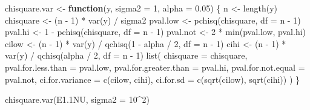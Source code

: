 \documentclass[
]{book}
\newenvironment{Shaded}{\begin{snugshade}}{\end{snugshade}}
\newcommand{\AttributeTok}[1]{\textcolor[rgb]{0.77,0.63,0.00}{#1}}
\newcommand{\ControlFlowTok}[1]{\textcolor[rgb]{0.13,0.29,0.53}{\textbf{#1}}}
\newcommand{\DecValTok}[1]{\textcolor[rgb]{0.00,0.00,0.81}{#1}}
\newcommand{\FloatTok}[1]{\textcolor[rgb]{0.00,0.00,0.81}{#1}}
\newcommand{\FunctionTok}[1]{\textcolor[rgb]{0.00,0.00,0.00}{#1}}
\newcommand{\NormalTok}[1]{#1}
\newcommand{\OtherTok}[1]{\textcolor[rgb]{0.56,0.35,0.01}{#1}}
\newcommand{\SpecialCharTok}[1]{\textcolor[rgb]{0.00,0.00,0.00}{#1}}
\begin{document}
\begin{Shaded}
\begin{Highlighting}[]
\NormalTok{chisquare.var }\OtherTok{\textless{}{-}} \ControlFlowTok{function}\NormalTok{(y, }\AttributeTok{sigma2 =} \DecValTok{1}\NormalTok{, }\AttributeTok{alpha =} \FloatTok{0.05}\NormalTok{) \{}
\NormalTok{  n }\OtherTok{\textless{}{-}} \FunctionTok{length}\NormalTok{(y)}
\NormalTok{  chisquare }\OtherTok{\textless{}{-}}\NormalTok{ (n }\SpecialCharTok{{-}} \DecValTok{1}\NormalTok{) }\SpecialCharTok{*} \FunctionTok{var}\NormalTok{(y) }\SpecialCharTok{/}\NormalTok{ sigma2}
\NormalTok{  pval.low }\OtherTok{\textless{}{-}} \FunctionTok{pchisq}\NormalTok{(chisquare, }\AttributeTok{df =}\NormalTok{ n }\SpecialCharTok{{-}} \DecValTok{1}\NormalTok{)}
\NormalTok{  pval.hi }\OtherTok{\textless{}{-}} \DecValTok{1} \SpecialCharTok{{-}} \FunctionTok{pchisq}\NormalTok{(chisquare, }\AttributeTok{df =}\NormalTok{ n }\SpecialCharTok{{-}} \DecValTok{1}\NormalTok{)}
\NormalTok{  pval.not }\OtherTok{\textless{}{-}} \DecValTok{2} \SpecialCharTok{*} \FunctionTok{min}\NormalTok{(pval.low, pval.hi)}
\NormalTok{  cilow }\OtherTok{\textless{}{-}}\NormalTok{ (n }\SpecialCharTok{{-}} \DecValTok{1}\NormalTok{) }\SpecialCharTok{*} \FunctionTok{var}\NormalTok{(y) }\SpecialCharTok{/} \FunctionTok{qchisq}\NormalTok{(}\DecValTok{1} \SpecialCharTok{{-}}\NormalTok{ alpha }\SpecialCharTok{/} \DecValTok{2}\NormalTok{, }\AttributeTok{df =}\NormalTok{ n }\SpecialCharTok{{-}} \DecValTok{1}\NormalTok{)}
\NormalTok{  cihi }\OtherTok{\textless{}{-}}\NormalTok{ (n }\SpecialCharTok{{-}} \DecValTok{1}\NormalTok{) }\SpecialCharTok{*} \FunctionTok{var}\NormalTok{(y) }\SpecialCharTok{/} \FunctionTok{qchisq}\NormalTok{(alpha }\SpecialCharTok{/} \DecValTok{2}\NormalTok{, }\AttributeTok{df =}\NormalTok{ n }\SpecialCharTok{{-}} \DecValTok{1}\NormalTok{)}
  \FunctionTok{list}\NormalTok{(}
    \AttributeTok{chisquare =}\NormalTok{ chisquare, }\AttributeTok{pval.for.less.than =}\NormalTok{ pval.low,}
    \AttributeTok{pval.for.greater.than =}\NormalTok{ pval.hi, }\AttributeTok{pval.for.not.equal =}\NormalTok{ pval.not,}
    \AttributeTok{ci.for.variance =} \FunctionTok{c}\NormalTok{(cilow, cihi), }\AttributeTok{ci.for.sd =} \FunctionTok{c}\NormalTok{(}\FunctionTok{sqrt}\NormalTok{(cilow), }\FunctionTok{sqrt}\NormalTok{(cihi))}
\NormalTok{  )}
\NormalTok{\}}
\end{Highlighting}
\end{Shaded}

\begin{Shaded}
\begin{Highlighting}[]
\FunctionTok{chisquare.var}\NormalTok{(E1}\FloatTok{.1}\NormalTok{NU, }\AttributeTok{sigma2 =} \DecValTok{10}\SpecialCharTok{\^{}}\DecValTok{2}\NormalTok{)}
\end{Highlighting}
\end{Shaded}
\end{document}

